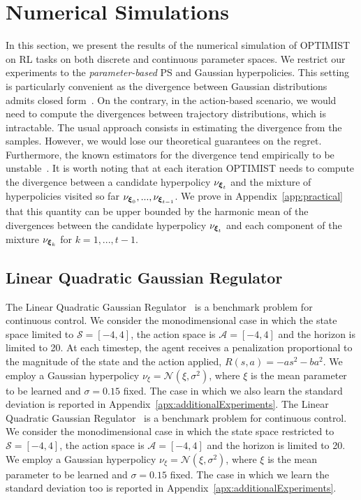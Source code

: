\documentclass{article}
\makeatletter
\DeclareRobustCommand{\algoname}{OPTIMIST\@\xspace}
\makeatother
\begin{document}
\section{Numerical Simulations}\label{sec:exp}
In this section, we present the results of the numerical simulation of \algoname on RL tasks on both discrete and continuous parameter spaces. We restrict our experiments to the \emph{parameter-based} PS and Gaussian hyperpolicies. This setting is particularly convenient as the \Renyi divergence between Gaussian distributions admits closed form~\cite{gil2013renyi}. On the contrary, in the action-based scenario, we would need to compute the divergences between trajectory distributions, which is intractable. The usual approach consists in estimating the \Renyi divergence from the samples. However, we would lose our theoretical guarantees on the regret. Furthermore, the known estimators for the \Renyi divergence tend empirically to be unstable~\cite{metelli2018policy}. It is worth noting that at each iteration \algoname needs to compute the \Renyi divergence between a candidate hyperpolicy $\nu_{\boldsymbol{\xi}_t}$ and the mixture of hyperpolicies visited so far $\nu_{\boldsymbol{\xi}_0}, ..., \nu_{\boldsymbol{\xi}_{t-1}}$. We prove in Appendix~\ref{app:practical} that this quantity can be upper bounded by the harmonic mean of the divergences between the candidate hyperpolicy $\nu_{\boldsymbol{\xi}_t}$ and each component of the mixture $\nu_{\boldsymbol{\xi}_{k}}$ for $k=1,...,t-1$. 

\subsection{Linear Quadratic Gaussian Regulator}
The Linear Quadratic Gaussian Regulator~\citep[LQG,][]{dorato1995linear} is a benchmark problem for continuous control. We consider the monodimensional case in which the state space limited to $\mathcal{S}=[-4,4]$, the action space is $\mathcal{A}=[-4,4]$ and the horizon is limited to 20. At each timestep, the agent receives a penalization proportional to the magnitude of the state and the action applied, \ie $R(s,a) = -a s^2 - b  a^2$. We employ a Gaussian hyperpolicy $\nu_{\xi} = \mathcal{N}( \xi, \sigma^2)$, where $\xi$ is the mean parameter to be learned and $\sigma=0.15$ fixed. The case in which we also learn the standard deviation is reported in Appendix~\ref{apx:additionalExperiments}.
The Linear Quadratic Gaussian Regulator~\citep[LQG,][]{dorato1995linear} is a benchmark problem
for continuous control. We consider the monodimensional case in which the state space restricted to $\mathcal{S}=[-4,4]$, the action space is $\mathcal{A}=[-4,4]$ and the horizon is limited to 20. We employ a Gaussian hyperpolicy $\nu_{\xi} = \mathcal{N}( \xi, \sigma^2)$, where $\xi$ is the mean parameter to be learned and $\sigma=0.15$ fixed. The case in which we learn the standard deviation too is reported in Appendix~\ref{apx:additionalExperiments}.
\end{document}
